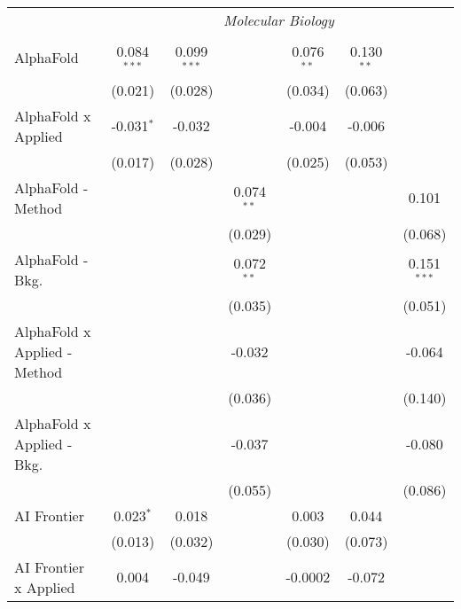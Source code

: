 \begin{tabular}{lcccccc}
 & \multicolumn{6}{c}{\textit{Molecular Biology}} \\ \\
   AlphaFold                      & 0.084$^{***}$ & 0.099$^{***}$ &                & 0.076$^{**}$ & 0.130$^{**}$ &   \\   
                                  & (0.021)       & (0.028)       &                & (0.034)      & (0.063)      &   \\   
   AlphaFold x Applied            & -0.031$^{*}$  & -0.032        &                & -0.004       & -0.006       &   \\   
                                  & (0.017)       & (0.028)       &                & (0.025)      & (0.053)      &   \\   
   AlphaFold - Method             &               &               & 0.074$^{**}$   &              &              & 0.101\\   
                                  &               &               & (0.029)        &              &              & (0.068)\\   
   AlphaFold - Bkg.               &               &               & 0.072$^{**}$   &              &              & 0.151$^{***}$\\   
                                  &               &               & (0.035)        &              &              & (0.051)\\   
   AlphaFold x Applied - Method   &               &               & -0.032         &              &              & -0.064\\   
                                  &               &               & (0.036)        &              &              & (0.140)\\   
   AlphaFold x Applied - Bkg.     &               &               & -0.037         &              &              & -0.080\\   
                                  &               &               & (0.055)        &              &              & (0.086)\\   
   AI Frontier                    & 0.023$^{*}$   & 0.018         &                & 0.003        & 0.044        &   \\   
                                  & (0.013)       & (0.032)       &                & (0.030)      & (0.073)      &   \\   
   AI Frontier x Applied          & 0.004         & -0.049        &                & -0.0002      & -0.072       &   \\   

\end{tabular}
